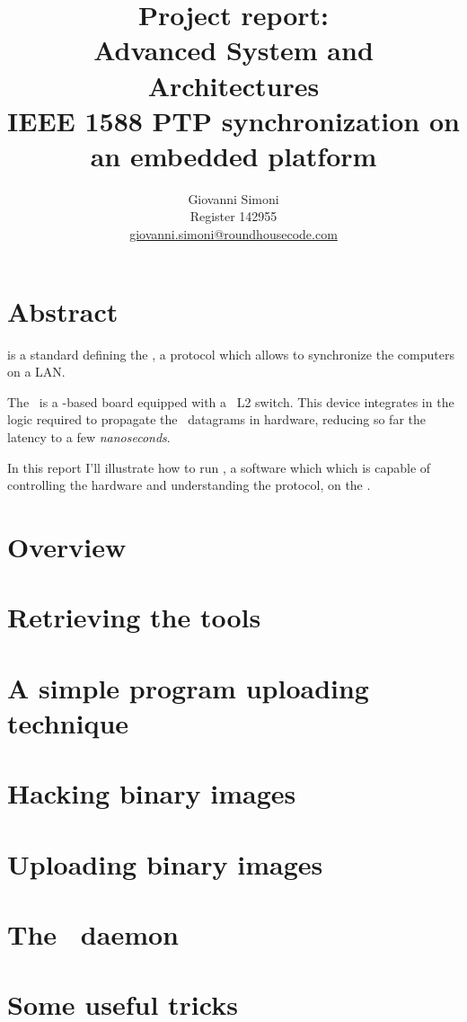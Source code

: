 \documentclass[10pt,a4paper]{article}
\title {
    Project report:\\
    Advanced System and Architectures\\
    IEEE 1588 PTP synchronization on an embedded platform
}
\author{
    Giovanni Simoni\\
    Register 142955\\
    \href{mailto:giovanni.simoni@roundhousecode.com}
         {giovanni.simoni@roundhousecode.com}
}
\begin{document}
\maketitle

    \section*{ \center Abstract }

         is a standard defining the , a protocol which allows to synchronize the
        computers on a LAN.

        The \MyBoard\ is a \PPC-based board equipped with a
        \Vitesse\ L2 switch. This device integrates in the logic required
        to propagate the \PTP\ datagrams in hardware, reducing so far the
        latency to a few \emph{nanoseconds}.

        In this report I'll illustrate how to run \PTPd, a software which
        which is capable of controlling the hardware and understanding the
        protocol, on the \MyBoard.

    \newpage
    \tableofcontents
    \newpage

    \section{ Overview } \label{sec:Overview}
    

    \section{ Retrieving the tools } \label{sec:GetTools}
    

    \section{ A simple program uploading technique } \label{sec:Upload}
    

    \section{ Hacking binary images } \label{sec:HackImages}
    

    \section{ Uploading binary images } \label{sec:UploadImages}
    

    \section{ The \PTP\ daemon } \label{sec:PTPd}
    

    \section{ Some useful tricks } \label{sec:Tricks}
    

\end{document}

